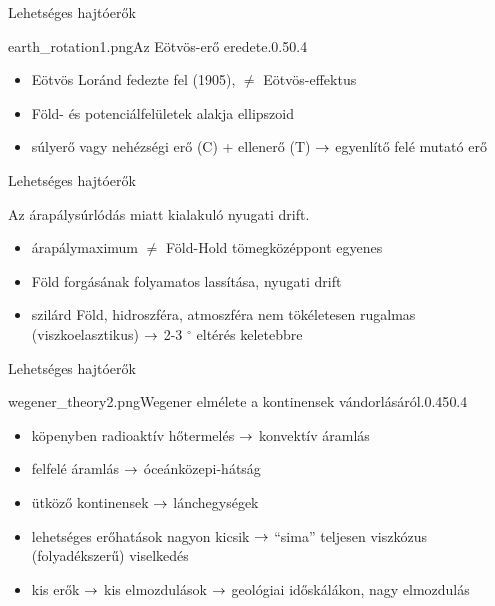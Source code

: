 \documentclass{beamer}
\begin{document}
\begin{frame}{Lehetséges hajtóerők}
    \begin{figp}{earth_rotation1.png}{Az Eötvös-erő eredete.}{0.5}{0.4}
        \begin{itemize}
            \item Eötvös Loránd fedezte fel (1905), $\ne$ Eötvös-effektus
            \item Föld- és potenciálfelületek alakja ellipszoid
            \item súlyerő vagy nehézségi erő (C) + ellenerő (T) $\rightarrow$ egyenlítő felé mutató erő
        \end{itemize}
    \end{figp}
\end{frame}


\begin{frame}{Lehetséges hajtóerők}
    \begin{minic}{0.7}
        \centering
        
        Az árapálysúrlódás miatt kialakuló nyugati drift.
    \end{minic}
    
    \begin{minipage}[c]{0.45\textwidth}
        \begin{itemize}
            \item árapálymaximum $\ne$ Föld-Hold tömegközéppont egyenes
            \item Föld forgásának folyamatos lassítása, nyugati drift
        \end{itemize}
    \end{minipage}
    \begin{minipage}[c]{0.45\textwidth}
        \begin{itemize}
            \item szilárd Föld, hidroszféra, atmoszféra nem tökéletesen rugalmas (viszkoelasztikus) $\rightarrow$ 2-3 $^\circ$ eltérés keletebbre
        \end{itemize}
    \end{minipage}
\end{frame}


\begin{frame}{Lehetséges hajtóerők}
    \begin{figp}{wegener_theory2.png}{Wegener elmélete a kontinensek vándorlásáról.}{0.45}{0.4}
        \begin{itemize}
            \item köpenyben radioaktív hőtermelés $\rightarrow$ konvektív áramlás
            \item felfelé áramlás $\rightarrow$ óceánközepi-hátság
            \item ütköző kontinensek $\rightarrow$ lánchegységek
            \item lehetséges erőhatások nagyon kicsik $\rightarrow$ ``sima'' teljesen viszkózus (folyadékszerű) viselkedés
            \item kis erők $\rightarrow$ kis elmozdulások $\rightarrow$ geológiai időskálákon, nagy elmozdulás
        \end{itemize}
    \end{figp}
\end{frame}
\end{document}
